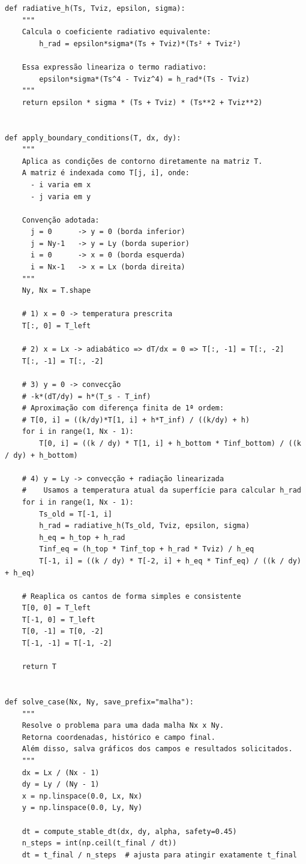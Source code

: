 \documentclass[12pt,a4paper]{article}
\begin{document}
\begin{lstlisting}
def radiative_h(Ts, Tviz, epsilon, sigma):
    """
    Calcula o coeficiente radiativo equivalente:
        h_rad = epsilon*sigma*(Ts + Tviz)*(Ts² + Tviz²)

    Essa expressão lineariza o termo radiativo:
        epsilon*sigma*(Ts^4 - Tviz^4) = h_rad*(Ts - Tviz)
    """
    return epsilon * sigma * (Ts + Tviz) * (Ts**2 + Tviz**2)


def apply_boundary_conditions(T, dx, dy):
    """
    Aplica as condições de contorno diretamente na matriz T.
    A matriz é indexada como T[j, i], onde:
      - i varia em x
      - j varia em y

    Convenção adotada:
      j = 0      -> y = 0 (borda inferior)
      j = Ny-1   -> y = Ly (borda superior)
      i = 0      -> x = 0 (borda esquerda)
      i = Nx-1   -> x = Lx (borda direita)
    """
    Ny, Nx = T.shape

    # 1) x = 0 -> temperatura prescrita
    T[:, 0] = T_left

    # 2) x = Lx -> adiabático => dT/dx = 0 => T[:, -1] = T[:, -2]
    T[:, -1] = T[:, -2]

    # 3) y = 0 -> convecção
    # -k*(dT/dy) = h*(T_s - T_inf)
    # Aproximação com diferença finita de 1ª ordem:
    # T[0, i] = ((k/dy)*T[1, i] + h*T_inf) / ((k/dy) + h)
    for i in range(1, Nx - 1):
        T[0, i] = ((k / dy) * T[1, i] + h_bottom * Tinf_bottom) / ((k / dy) + h_bottom)

    # 4) y = Ly -> convecção + radiação linearizada
    #    Usamos a temperatura atual da superfície para calcular h_rad
    for i in range(1, Nx - 1):
        Ts_old = T[-1, i]
        h_rad = radiative_h(Ts_old, Tviz, epsilon, sigma)
        h_eq = h_top + h_rad
        Tinf_eq = (h_top * Tinf_top + h_rad * Tviz) / h_eq
        T[-1, i] = ((k / dy) * T[-2, i] + h_eq * Tinf_eq) / ((k / dy) + h_eq)

    # Reaplica os cantos de forma simples e consistente
    T[0, 0] = T_left
    T[-1, 0] = T_left
    T[0, -1] = T[0, -2]
    T[-1, -1] = T[-1, -2]

    return T


def solve_case(Nx, Ny, save_prefix="malha"):
    """
    Resolve o problema para uma dada malha Nx x Ny.
    Retorna coordenadas, histórico e campo final.
    Além disso, salva gráficos dos campos e resultados solicitados.
    """
    dx = Lx / (Nx - 1)
    dy = Ly / (Ny - 1)
    x = np.linspace(0.0, Lx, Nx)
    y = np.linspace(0.0, Ly, Ny)

    dt = compute_stable_dt(dx, dy, alpha, safety=0.45)
    n_steps = int(np.ceil(t_final / dt))
    dt = t_final / n_steps  # ajusta para atingir exatamente t_final


\end{lstlisting}
\end{document}

